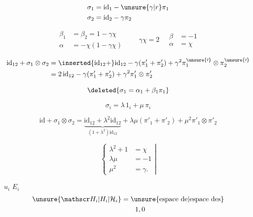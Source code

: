 \[
\begin{aligned}
\sigma_1&=\mathrm{id}_1-\unsure{\gamma|r}\pi_1\\
\sigma_2&=\mathrm{id}_2-\gamma\pi_2
\end{aligned}
\]

\[
\begin{aligned}\beta_1&=\beta_2=1-\gamma\chi\\
\alpha&=-\chi(1-\gamma\chi)\end{aligned}
\qquad
\boxed{\gamma\chi=2}\quad
\boxed{\begin{aligned}\beta&=-1\\\alpha&=\chi\end{aligned}}
\]

\[
\begin{aligned}
\mathrm{id}_{12}+\sigma_1\otimes\sigma_2
 &=\inserted{\mathrm{id}_{12}+}\mathrm{id}_{12}-\gamma(\pi'_1+\pi'_2)+\gamma^2\pi_1^{\unsure{\prime}}\otimes\pi_2^{\unsure{\prime}}\\
 &=2\,\mathrm{id}_{12}-\gamma(\pi'_1+\pi'_2)+\gamma^2\pi'_1\otimes\pi'_2
\end{aligned}
\]

\[\deleted{\sigma_1=\alpha_1+\beta_1\pi_1}\]

\[\sigma_i=\lambda\,1_i+\mu\,\pi_i\]

\[
\mathrm{id}+\sigma_1\otimes\sigma_2=
\underbrace{\mathrm{id}_{12}+\lambda^2\mathrm{id}_{12}}_{(1+\lambda^2)\mathrm{id}_{12}}
+\lambda\mu(\pi'_1+\pi'_2)+\mu^2\pi'_1\otimes\pi'_2
\]

\[
\left\{\begin{aligned}\lambda^2+1&=\chi\\
\lambda\mu&=-1\\
\mu^2&=\gamma.\end{aligned}\right|
\]

$u_i$  $E_i$ 
\[
\begin{aligned}
\unsure{\mathscr H_i|H_i|\mathcal H_i}&=\text{\unsure{espace de|espace des}}\\
&\qquad 1,0
\end{aligned}
\]


